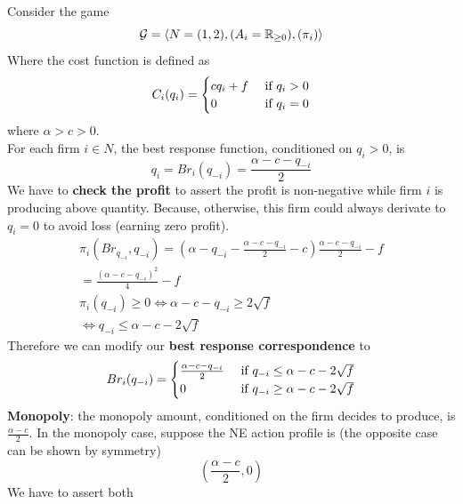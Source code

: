 \documentclass[11pt]{article}
\begin{document}
	\begin{example}
		Consider the game 
		\begin{equation}
			\mathcal{{G}} = \langle N = (1,2), (A_i = \mathbb{R}_{\geq0}), (\pi_i) \rangle
		\end{equation}
		Where the cost function is defined as
		\begin{equation}
			C_i(q_i) = \begin{cases}
				c q_i + f &\text{{ if }} q_i > 0 \\
				0 &\text{{ if }} q_i = 0
			\end{cases}
		\end{equation}
		where $\alpha > c > 0$. \\
		For each firm $i \in N$, the best response function, conditioned on $q_i > 0$, is
		\begin{equation}
			q_i = Br_i(q_{-i}) = \frac{\alpha - c - q_{-i}}{2}
		\end{equation}
		We have to \textbf{check the profit} to assert the profit is non-negative while firm $i$ is producing above quantity. Because, otherwise, this firm could always derivate to $q_i = 0$ to avoid loss (earning zero profit).
		\begin{gather}
			\pi_i(Br_{q_{-i}}, q_{-i}) = (\alpha - q_{-i} - \frac{\alpha - c - q_{-i}}{2} - c)\frac{\alpha - c - q_{-i}}{2} - f \\
			= \frac{(\alpha - c - q_{-i})^2}{4} - f \\
			\pi_i(q_{-i}) \geq 0 \iff \alpha - c - q_{-i} \geq 2\sqrt{f} \\
			\iff q_{-i} \leq \alpha - c - 2\sqrt{f}
		\end{gather}
		Therefore we can modify our \textbf{best response correspondence} to
		\begin{gather}
			Br_i(q_{-i}) = 
			\begin{cases}
				\frac{\alpha - c - q_{-i}}{2} &\text{{ if }}  q_{-i} \leq \alpha - c - 2\sqrt{f} \\
				0 &\text{{ if }} q_{-i} \geq \alpha - c - 2\sqrt{f}
			\end{cases}
		\end{gather}
		\textbf{Monopoly}: the monopoly amount, conditioned on the firm decides to produce, is $\frac{\alpha - c}{2}$. In the monopoly case, suppose the NE action profile is (the opposite case can be shown by symmetry)
		\begin{equation}
			(\frac{\alpha - c}{2}, 0)
		\end{equation}
		We have to assert both 
		\begin{gather}

\end{gather}
\end{example}
\end{document}
